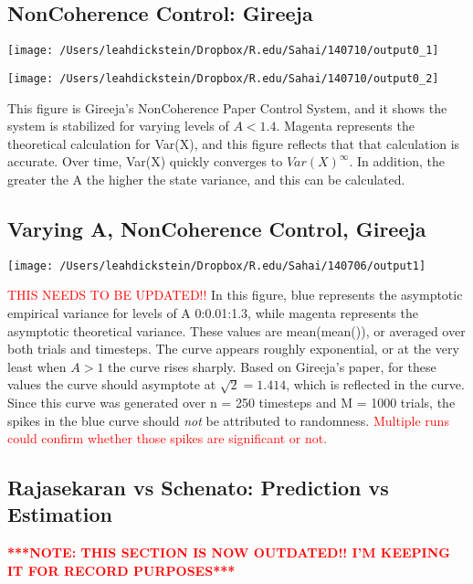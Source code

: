 \documentclass[leqno,twocolumn]{article}
\begin{document}
\subsection{NonCoherence Control: Gireeja}
\begin{minipage}[c]{0.5\textwidth}
\texttt{[image: /Users/leahdickstein/Dropbox/R.edu/Sahai/140710/output0\_1]}
\end{minipage}
\begin{minipage}[c]{0.5\textwidth}
\texttt{[image: /Users/leahdickstein/Dropbox/R.edu/Sahai/140710/output0\_2]}
\end{minipage}

This figure is Gireeja's NonCoherence Paper Control System, and it shows the system is stabilized for varying levels of $A < 1.4$. Magenta represents the theoretical calculation for Var(X), and this figure reflects that that calculation is accurate. Over time, Var(X) quickly converges to $Var(X)^\infty$. In addition, the greater the A the higher the state variance, and this can be calculated.

\subsection{Varying A, NonCoherence Control, Gireeja}
\begin{minipage}[c]{0.5\textwidth}
\texttt{[image: /Users/leahdickstein/Dropbox/R.edu/Sahai/140706/output1]}
\end{minipage}
\begin{minipage}[b]{0.5\textwidth}
\textcolor{red}{THIS NEEDS TO BE UPDATED!!} In this figure, blue represents the asymptotic empirical variance for levels of A 0:0.01:1.3, while magenta represents the asymptotic theoretical variance. These values are mean(mean()), or averaged over both trials and timesteps. The curve appears roughly exponential, or at the very least when $A > 1$ the curve rises sharply. Based on Gireeja's paper, for these values the curve should asymptote at $\sqrt{2} = 1.414$, which is reflected in the curve. Since this curve was generated over n = 250 timesteps and M = 1000 trials, the spikes in the blue curve should \textit{not} be attributed to randomness. \textcolor{red}{Multiple runs could confirm whether those spikes are significant or not.}
\end{minipage}

\subsection{Rajasekaran vs Schenato: Prediction vs Estimation}
\textcolor{red}{\textbf{***NOTE: THIS SECTION IS NOW OUTDATED!! I'M KEEPING IT FOR RECORD PURPOSES***}}\\
\end{document}
